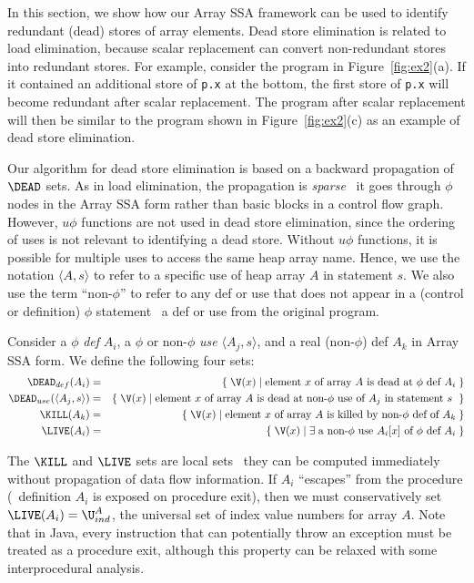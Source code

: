 In this section, we show how our Array SSA framework can be used to
identify redundant (dead) stores of array elements.  Dead store
elimination is related to load elimination, because scalar
replacement can convert non-redundant stores into redundant stores.
For example, consider the program in
Figure~\ref{fig:ex2}(a).  If it contained an additional
store of {\tt p.x} at the bottom, the first store of {\tt p.x} will
become redundant after scalar replacement.  The program after scalar
replacement will then be similar to the program shown in
Figure~\ref{fig:ex2}(c) as an example of dead
store elimination.

Our algorithm for dead store elimination is based on a backward
propagation of $\DEAD$ sets.  As in load elimination,
the propagation is {\it sparse} \ie\ it goes through $\phi$ nodes in
the Array SSA form rather than basic blocks in a control flow graph.
However, $u\phi$ functions are not used in
dead store elimination, since the ordering of uses is not relevant
to identifying a dead store.
Without $u\phi$ functions, it is possible for
multiple uses to access the same heap array name.
Hence, we use the notation $\langle A,s \rangle$
to refer to a specific use of
heap array $A$ in statement $s$.
We also
use the term ``non-$\phi$'' to refer to any def or use that does not
appear in a (control or definition)
$\phi$ statement \ie\ a def or use from the original program.

Consider a $\phi$ {\it def} $A_i$, a $\phi$ or non-$\phi$ {\it use} $\langle A_j, s \rangle$, and a real
(non-$\phi$) def $A_k$ in Array SSA form.  We define the following
four sets:
\begin{eqnarray*}
\DEAD_{def}(A_i) & = & \{\; \V(x) \; | \; 
\mbox{element $x$ of array $A$ is dead at $\phi$ def $A_i$} \;\} \\
\DEAD_{use}(\langle A_j,s \rangle) & = & \{\; \V(x) \; | \; 
\mbox{element $x$ of array $A$ is dead at non-$\phi$ use of $A_j$ in statement $s$ } \;\} \\
\KILL(A_k) & = & \{\; \V(x) \;|\; \mbox{element $x$ of array $A$ is killed by
non-$\phi$ def of $A_k$} \;\}\\
\LIVE(A_i) & = & \{ \; \V(x) \;| \; \exists \; \mbox{a non-$\phi$ use $A_i[x]$ of
$\phi$ def $A_i$}\;\}
\end{eqnarray*}

The $\KILL$ and $\LIVE$ sets are local sets \ie\ they can be computed 
immediately
without propagation of data flow information.
If $A_i$ ``escapes'' from the procedure (\ie\ definition
$A_i$ is exposed on procedure exit), then we must conservatively
set $\LIVE(A_i) = \U^A_{ind}$, the universal set of index value numbers
for array $A$.  Note that in Java, every instruction that can potentially
throw an exception must be treated as a procedure exit, although this
property can be relaxed with some interprocedural analysis.

